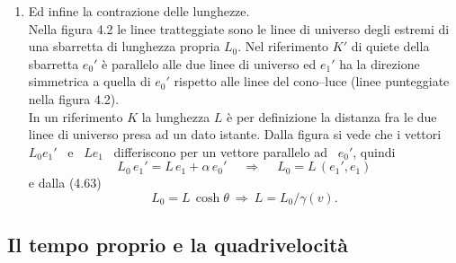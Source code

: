 \begin{enumerate}
    Siano $E_1$ ed $E_2$ gli eventi corrispondenti alla produzione e al
    decadimento del
    mesone $\mu$ e sia \ $v\in V^+$ \ il vettore $\overline{E_1E_2}$. In ogni
    riferimento il tempo di vita del mesone $\mu$ \`e la coordinata temporale
    (in quel riferimento) del vettore $v$: nel riferimento in cui il mesone \`e
    in quiete $v$ \`e parallelo all'asse dei tempi $e_0'$, quindi detto \ $\tau$
    \ il tempo di vita del mesone nel suo riferimento di quiete, si ha
    \begin{equation}
      v=c\tau\,e_0',\qquad\quad\Big(c\tau\equiv\sqrt{-(v,v)}\,\Big).
      \tag{4.64}
    \end{equation}
    In un riferimento individuato da $e_0$ la coordinata temporale del vettore
    $v$, cio\`e l'intervallo temporale $\Delta t$ fra i due eventi, si ottiene
    da
    \begin{equation}
      \begin{aligned}
        &v=c\Delta t\,e_0+\alpha\,e_1\quad\ \Rightarrow\\
        &c\Delta t=-(v,e_0)=-c\tau(e_0',e_0)
        =c\tau\,\cosh\theta=c\gamma(v)\tau\,.
      \end{aligned}
      \tag{4.65}
    \end{equation}
  \item Ed infine la contrazione delle lunghezze.\\
    Nella figura 4.2 le linee tratteggiate sono le linee di universo degli
    estremi di una sbarretta di lunghezza propria $L_0$. Nel riferimento $K'$ di
    quiete della sbarretta $e_0'$ \`e parallelo alle due linee di universo ed
    $e_1'$ ha la direzione simmetrica a quella di $e_0'$ rispetto alle linee del
    cono--luce (linee punteggiate nella figura 4.2).\\
    In un riferimento $K$ la lunghezza $L$ \`e per definizione la distanza fra
    le due linee di universo presa ad un dato istante. Dalla figura si vede che
    i vettori \ $L_0e_1'$ \ e \ $Le_1$ \ differiscono per un vettore parallelo
    ad \ $e_0'$, quindi
    \[
      L_0\,e_1'=L\,e_1+\alpha\,e_0'\quad\ \Rightarrow\quad\ L_0=L\,(e_1',e_1)
    \]
    e dalla (4.63)
    \[
      L_0=L\,\cosh\theta\ \Rightarrow\ L=L_0/\gamma(v).
    \]
\end{enumerate}

\subsection{Il tempo proprio e la quadrivelocit\`a}

